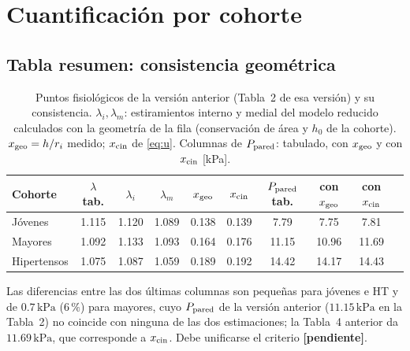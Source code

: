 \documentclass[11pt]{article}
\newcommand{\kPa}{\,\mathrm{kPa}}
\newcommand{\pend}{\textcolor{red!70!black}{\textbf{[pendiente]}}}
\begin{document}
\section{Cuantificación por cohorte}\label{sec:tablas}
\subsection{Tabla resumen: consistencia geométrica}
\begin{table}[H]\centering\small
\caption{Puntos fisiológicos de la versión anterior (Tabla~2 de esa versión) y su consistencia. $\lambda_i,\lambda_m$: estiramientos interno y medial del modelo reducido calculados con la geometría de la fila (conservación de área y $h_0$ de la cohorte). $x_{\rm geo}=h/r_i$ medido; $x_{\rm cin}$ de \eqref{eq:u}. Columnas de $P_{\rm pared}$: tabulado, con $x_{\rm geo}$ y con $x_{\rm cin}$ [kPa].}\label{tab:geo}
\setlength{\tabcolsep}{4pt}
\begin{tabular}{lccccccccc}\toprule
Cohorte & $\lambda$ tab. & $\lambda_i$ & $\lambda_m$ & $x_{\rm geo}$ & $x_{\rm cin}$ & $P_{\rm pared}$ tab. & con $x_{\rm geo}$ & con $x_{\rm cin}$\\\midrule
Jóvenes & 1.115 & 1.120 & 1.089 & 0.138 & 0.139 & 7.79 & 7.75 & 7.81 \\
Mayores & 1.092 & 1.133 & 1.093 & 0.164 & 0.176 & 11.15 & 10.96 & 11.69 \\
Hipertensos & 1.075 & 1.087 & 1.059 & 0.189 & 0.192 & 14.42 & 14.17 & 14.43 \\

\bottomrule\end{tabular}
\end{table}
Las diferencias entre las dos últimas columnas son pequeñas para jóvenes e HT y de $0.7\kPa$ ($6\,\%$) para mayores, cuyo $P_{\rm pared}$ de la versión anterior ($11.15\kPa$ en la Tabla~2) no coincide con ninguna de las dos estimaciones; la Tabla~4 anterior da $11.69\kPa$, que corresponde a $x_{\rm cin}$. Debe unificarse el criterio \pend.
\end{document}
